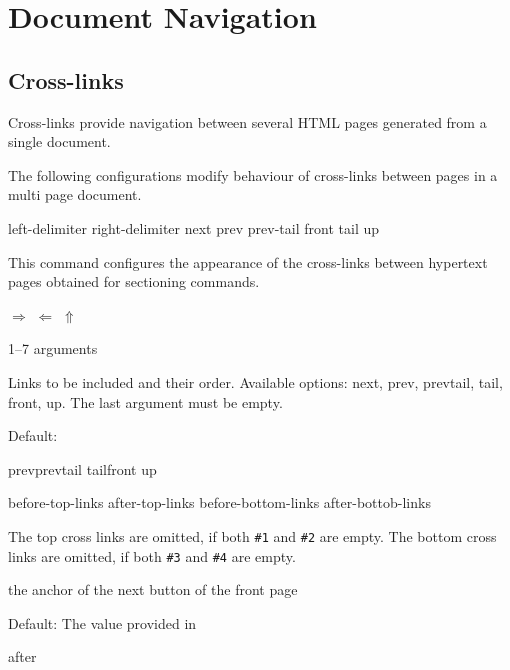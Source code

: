\documentclass{book}
\begin{document}
\section{Document Navigation}


\subsection{Cross-links}

Cross-links provide navigation between several HTML pages generated from a single document.

The following configurations modify behaviour of cross-links between pages in a multi page document.

 {left-delimiter} {right-delimiter} {next} {prev} {prev-tail} {front} {tail} {up}\EndDoc

This command configures the appearance of the cross-links between hypertext pages obtained for sectioning commands.

\begin{texsource}
   {}{}{$\scriptstyle\Rightarrow$}
   {$\scriptstyle\Leftarrow$}
   {}{}{}{$\scriptstyle\Uparrow$}
\end{texsource}

 {1--7 arguments}\EndDoc

  Links to be included and their order. Available
  options: next, prev, prevtail, tail, front, up.
  The last argument must be empty.

  Default:

\begin{texsource}
   {prev}{prevtail}
   {tail}{front}
   {up}{}
\end{texsource}

 {before-top-links} {after-top-links} {before-bottom-links} {after-bottob-links}\EndDoc

The top cross links are omitted, if both \verb|#1| and \verb|#2| are empty.
The bottom cross links are omitted, if both \verb|#3| and \verb|#4| are empty.

 {the anchor of the next button of the front page}\EndDoc

Default: The value provided in 

 {after}\EndDoc
\end{document}
